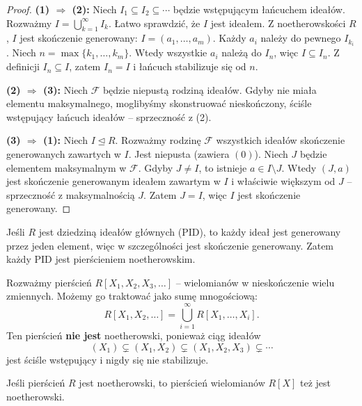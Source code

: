 \begin{proof}
\noindent
\textbf{(1) $\Rightarrow$ (2):} Niech $I_1 \subseteq I_2 \subseteq \cdots$ będzie wstępującym łańcuchem ideałów. Rozważmy $I = \bigcup_{k=1}^\infty I_k$. Łatwo sprawdzić, że $I$ jest ideałem. Z noetherowskości $R$, $I$ jest skończenie generowany: $I = (a_1, \dots, a_m)$. Każdy $a_i$ należy do pewnego $I_{k_i}$. Niech $n = \max\{k_1, \dots, k_m\}$. Wtedy wszystkie $a_i$ należą do $I_n$, więc $I \subseteq I_n$. Z definicji $I_n \subseteq I$, zatem $I_n = I$ i łańcuch stabilizuje się od $n$.

\textbf{(2) $\Rightarrow$ (3):} Niech $\mathcal{F}$ będzie niepustą rodziną ideałów. Gdyby nie miała elementu maksymalnego, moglibyśmy skonstruować nieskończony, ściśle wstępujący łańcuch ideałów – sprzeczność z (2).

\textbf{(3) $\Rightarrow$ (1):} Niech $I \trianglelefteq R$. Rozważmy rodzinę $\mathcal{F}$ wszystkich ideałów skończenie generowanych zawartych w $I$. Jest niepusta (zawiera $(0)$). Niech $J$ będzie elementem maksymalnym w $\mathcal{F}$. Gdyby $J \neq I$, to istnieje $a \in I \setminus J$. Wtedy $(J, a)$ jest skończenie generowanym ideałem zawartym w $I$ i właściwie większym od $J$ – sprzeczność z maksymalnością $J$. Zatem $J = I$, więc $I$ jest skończenie generowany.
\end{proof}

\begin{eg}
Jeśli $R$ jest dziedziną ideałów głównych (PID), to każdy ideał jest generowany przez jeden element, więc w szczególności jest skończenie generowany. Zatem każdy PID jest pierścieniem noetherowskim.
\end{eg}

\begin{eg}
Rozważmy pierścień $R[X_1, X_2, X_3, \dots]$ – wielomianów w nieskończenie wielu zmiennych. Możemy go traktować jako sumę mnogościową:
\[
R[X_1, X_2, \dots] = \bigcup_{i=1}^\infty R[X_1, \dots, X_i].
\]
Ten pierścień \textbf{nie jest} noetherowski, ponieważ ciąg ideałów
\[
(X_1) \subsetneq (X_1, X_2) \subsetneq (X_1, X_2, X_3) \subsetneq \cdots
\]
jest ściśle wstępujący i nigdy się nie stabilizuje.
\end{eg}

\begin{theorem}
Jeśli pierścień $R$ jest noetherowski, to pierścień wielomianów $R[X]$ też jest noetherowski.
\end{theorem}

